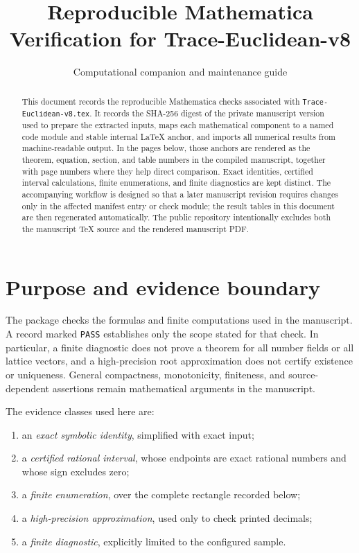 \documentclass[12pt,a4paper]{amsart}
\title[Trace-Euclidean-v8 verification]{Reproducible Mathematica Verification for Trace-Euclidean-v8}
\author[Verification guide]{Computational companion and maintenance guide}
\date{}
\theoremstyle{remark}
\theoremstyle{definition}
\begin{document}
\begin{abstract}
This document records the reproducible Mathematica checks associated with
\texttt{Trace-Euclidean-v8.tex}.  It records the SHA-256 digest of the private
manuscript version used to prepare the extracted inputs, maps each mathematical
component to a named code module and stable internal LaTeX anchor, and imports
all numerical results from machine-readable output.  In the pages below, those anchors are rendered as the theorem,
equation, section, and table numbers in the compiled manuscript, together with
page numbers where they help direct comparison.
Exact identities, certified interval calculations, finite enumerations, and
finite diagnostics are kept distinct.  The accompanying workflow is designed
so that a later manuscript revision requires changes only in the affected
manifest entry or check module; the result tables in this document are then
regenerated automatically.
The public repository intentionally excludes both the manuscript TeX source and
the rendered manuscript PDF.
\end{abstract}
\maketitle

\section{Purpose and evidence boundary}

The package checks the formulas and finite computations used in the manuscript.
A record marked \texttt{PASS} establishes only the scope stated for that check.
In particular, a finite diagnostic does not prove a theorem for all number
fields or all lattice vectors, and a high-precision root approximation does not
certify existence or uniqueness.  General compactness, monotonicity, finiteness,
and source-dependent assertions remain mathematical arguments in the manuscript.

The evidence classes used here are:
\begin{enumerate}[label=\textup{(\roman*)}]
\item an \emph{exact symbolic identity}, simplified with exact input;
\item a \emph{certified rational interval}, whose endpoints are exact rational
numbers and whose sign excludes zero;
\item a \emph{finite enumeration}, over the complete rectangle recorded below;
\item a \emph{high-precision approximation}, used only to check printed decimals;
\item a \emph{finite diagnostic}, explicitly limited to the configured sample.
\end{enumerate}
\end{document}
